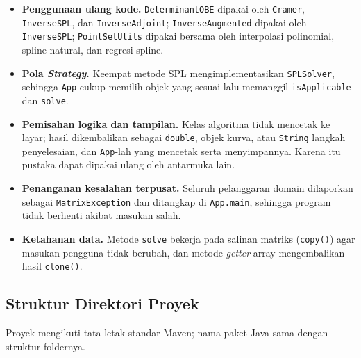 \documentclass[12pt,a4paper]{report}
\begin{document}
\begin{itemize}
  \item \textbf{Penggunaan ulang kode.} \texttt{DeterminantOBE} dipakai oleh
    \texttt{Cramer}, \texttt{InverseSPL}, dan \texttt{InverseAdjoint};
    \texttt{InverseAugmented} dipakai oleh \texttt{InverseSPL}; \newline
    \texttt{PointSetUtils} dipakai bersama oleh interpolasi polinomial, spline
    natural, dan regresi spline.
  \item \textbf{Pola \textit{Strategy}.} Keempat metode SPL mengimplementasikan
    \texttt{SPLSolver}, sehingga \texttt{App} cukup memilih objek yang sesuai
    lalu memanggil \texttt{isApplicable} dan \texttt{solve}.
  \item \textbf{Pemisahan logika dan tampilan.} Kelas algoritma tidak
    mencetak ke layar; hasil dikembalikan sebagai \texttt{double}, objek
    kurva, atau \texttt{String} langkah penyelesaian, dan \texttt{App}-lah yang
    mencetak serta menyimpannya. Karena itu pustaka dapat dipakai ulang oleh
    antarmuka lain.
  \item \textbf{Penanganan kesalahan terpusat.} Seluruh pelanggaran domain
    dilaporkan sebagai \texttt{MatrixException} dan ditangkap di
    \texttt{App.main}, sehingga program tidak berhenti akibat masukan salah.
  \item \textbf{Ketahanan data.} Metode \texttt{solve} bekerja pada salinan
    matriks (\texttt{copy()}) agar masukan pengguna tidak berubah, dan
    metode \textit{getter} array mengembalikan hasil \texttt{clone()}.
\end{itemize}

\subsection{Struktur Direktori Proyek}

Proyek mengikuti tata letak standar Maven; nama paket Java sama dengan
struktur foldernya.
\end{document}
